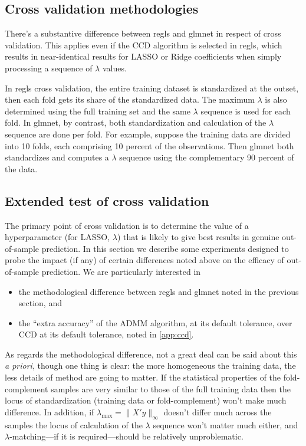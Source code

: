 \documentclass{article}
\begin{document}
\subsection*{Cross validation methodologies}

There's a substantive difference between \textsf{regls} and
\textsf{glmnet} in respect of cross validation. This applies even if
the CCD algorithm is selected in \textsf{regls}, which results in
near-identical results for LASSO or Ridge coefficients when simply
processing a sequence of $\lambda$ values.

In \textsf{regls} cross validation, the entire training dataset is
standardized at the outset, then each fold gets its share of the
standardized data. The maximum $\lambda$ is also determined using the
full training set and the same $\lambda$ sequence is used for each
fold. In \textsf{glmnet}, by contrast, both standardization and
calculation of the $\lambda$ sequence are done per fold. For example,
suppose the training data are divided into 10 folds, each comprising
10 percent of the observations. Then \textsf{glmnet} both standardizes
and computes a $\lambda$ sequence using the complementary 90 percent
of the data.

\subsection*{Extended test of cross validation}

The primary point of cross validation is to determine the value of a
hyperparameter (for LASSO, $\lambda$) that is likely to give best
results in genuine out-of-sample prediction. In this section we
describe some experiments designed to probe the impact (if any) of
certain differences noted above on the efficacy of out-of-sample
prediction. We are particularly interested in
\begin{itemize}
\item the methodological difference between \textsf{regls} and
  \textsf{glmnet} noted in the previous section, and
\item the ``extra accuracy'' of the ADMM algorithm, at its default
  tolerance, over CCD at its default tolerance, noted in
  \ref{app:ccd}.
\end{itemize}

As regards the methodological difference, not a great deal can be said
about this \textit{a priori}, though one thing is clear: the more
homogeneous the training data, the less details of method are going to
matter. If the statistical properties of the fold-complement samples
are very similar to those of the full training data then the locus of
standardization (training data or fold-complement) won't make much
difference. In addition, if $\lambda_{\max} = \|X'y\|_{\infty}$
doesn't differ much across the samples the locus of calculation of the
$\lambda$ sequence won't matter much either, and
$\lambda$-matching---if it is required---should be relatively
unproblematic.
\end{document}
